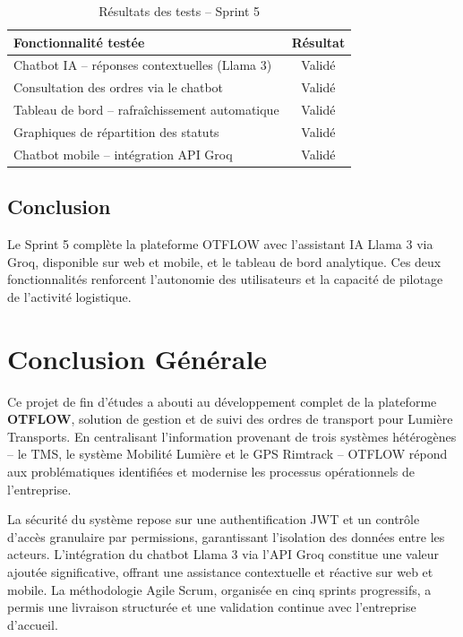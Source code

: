 \documentclass[12pt,a4paper,oneside]{report}
\begin{document}
\begin{table}[H]
\centering
\caption{Résultats des tests -- Sprint 5}
\begin{tabular}{|p{8.5cm}|c|}
\hline
\textbf{Fonctionnalité testée} & \textbf{Résultat} \\
\hline
Chatbot IA -- réponses contextuelles (Llama 3) & Validé \\
\hline
Consultation des ordres via le chatbot & Validé \\
\hline
Tableau de bord -- rafraîchissement automatique & Validé \\
\hline
Graphiques de répartition des statuts & Validé \\
\hline
Chatbot mobile -- intégration API Groq & Validé \\
\hline
\end{tabular}
\end{table}

\section{Conclusion}
Le Sprint 5 complète la plateforme OTFLOW avec l'assistant IA Llama 3 via Groq, disponible sur web et mobile, et le tableau de bord analytique. Ces deux fonctionnalités renforcent l'autonomie des utilisateurs et la capacité de pilotage de l'activité logistique.

\chapter*{Conclusion Générale}

Ce projet de fin d'études a abouti au développement complet de la plateforme \textbf{OTFLOW}, solution de gestion et de suivi des ordres de transport pour Lumière Transports. En centralisant l'information provenant de trois systèmes hétérogènes -- le TMS, le système Mobilité Lumière et le GPS Rimtrack -- OTFLOW répond aux problématiques identifiées et modernise les processus opérationnels de l'entreprise.

La sécurité du système repose sur une authentification JWT et un contrôle d'accès granulaire par permissions, garantissant l'isolation des données entre les acteurs. L'intégration du chatbot Llama 3 via l'API Groq constitue une valeur ajoutée significative, offrant une assistance contextuelle et réactive sur web et mobile. La méthodologie Agile Scrum, organisée en cinq sprints progressifs, a permis une livraison structurée et une validation continue avec l'entreprise d'accueil.
\end{document}
